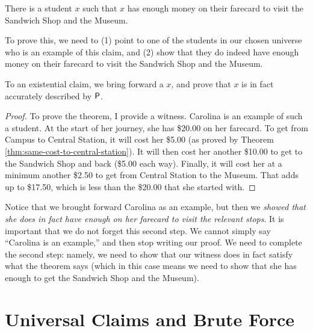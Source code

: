 \documentclass[../../../main.tex]{subfiles}
\begin{document}
\begin{framed}
  \begin{theorem}
    There is a student $x$ such that $x$ has enough money on their farecard to visit the Sandwich Shop and the Museum.
  \end{theorem}
\end{framed}

\noindent
To prove this, we need to (1) point to one of the students in our chosen universe who is an example of this claim, and (2) show that they do indeed have enough money on their farecard to visit the Sandwich Shop and the Museum.

\begin{aside}
  \begin{remark}
    To  an existential claim, we bring forward a  $x$, and prove that $x$ is in fact accurately described by $\P/$.
  \end{remark}
\end{aside}

\begin{framed}
  \begin{proof}
    To prove the theorem, I provide a witness. Carolina is an example of such a student. At the start of her journey, she has \$20.00 on her farecard. To get from Campus to Central Station, it will cost her \$5.00 (as proved by Theorem \ref{thm:same-cost-to-central-station}). It will then cost her another \$10.00 to get to the Sandwich Shop and back (\$5.00 each way). Finally, it will cost her at a minimum another \$2.50 to get from Central Station to the Museum. That adds up to \$17.50, which is less than the \$20.00 that she started with.
  \end{proof}
\end{framed}

Notice that we brought forward Carolina as an example, but then we \emph{showed that she does in fact have enough on her farecard to visit the relevant stops}. It is important that we do not forget this second step. We cannot simply say ``Carolina is an example,'' and then stop writing our proof. We need to complete the second step: namely, we need to show that our witness does in fact satisfy what the theorem says (which in this case means we need to show that she has enough to get the Sandwich Shop and the Museum).


\section{Universal Claims and Brute Force}
\end{document}
